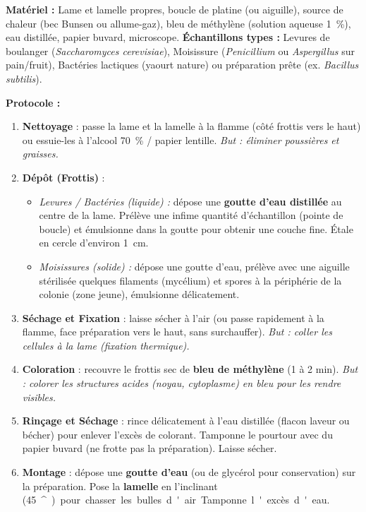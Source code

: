 \documentclass[11pt]{article}
\providecommand{\degree}{^{\circ}}
\begin{document}
\begin{experience}
\textbf{Matériel :} Lame et lamelle propres, boucle de platine (ou aiguille), source de chaleur (bec Bunsen ou allume-gaz), bleu de méthylène (solution aqueuse \SI{1}{\%}), eau distillée, papier buvard, microscope.
\textbf{Échantillons types :} Levures de boulanger (\emph{Saccharomyces cerevisiae}), Moisissure (\emph{Penicillium} ou \emph{Aspergillus} sur pain/fruit), Bactéries lactiques (yaourt nature) ou préparation prête (ex. \emph{Bacillus subtilis}).

\textbf{Protocole :}
\begin{enumerate}
    \item \textbf{Nettoyage} : passe la lame et la lamelle à la flamme (côté frottis vers le haut) ou essuie-les à l'alcool \SI{70}{\%} / papier lentille. \emph{But : éliminer poussières et graisses.}
    \item \textbf{Dépôt (Frottis)} :
    \begin{itemize}
        \item \emph{Levures / Bactéries (liquide) :} dépose une \textbf{goutte d'eau distillée} au centre de la lame. Prélève une infime quantité d'échantillon (pointe de boucle) et émulsionne dans la goutte pour obtenir une couche fine. Étale en cercle d'environ \SI{1}{\centi\meter}.
        \item \emph{Moisissures (solide) :} dépose une goutte d'eau, prélève avec une aiguille stérilisée quelques filaments (mycélium) et spores à la périphérie de la colonie (zone jeune), émulsionne délicatement.
    \end{itemize}
    \item \textbf{Séchage et Fixation} : laisse sécher à l'air (ou passe rapidement à la flamme, face préparation vers le haut, sans surchauffer). \emph{But : coller les cellules à la lame (fixation thermique).}
    \item \textbf{Coloration} : recouvre le frottis sec de \textbf{bleu de méthylène} (1 à 2 min). \emph{But : colorer les structures acides (noyau, cytoplasme) en bleu pour les rendre visibles.}
    \item \textbf{Rinçage et Séchage} : rince délicatement à l'eau distillée (flacon laveur ou bécher) pour enlever l'excès de colorant. Tamponne le pourtour avec du papier buvard (ne frotte pas la préparation). Laisse sécher.
    \item \textbf{Montage} : dépose une \textbf{goutte d'eau} (ou de glycérol pour conservation) sur la préparation. Pose la \textbf{lamelle} en l'inclinant (\SI{45}{\degree}) pour chasser les bulles d'air. Tamponne l'excès d'eau.
\end{enumerate}


\end{experience}
\end{document}
